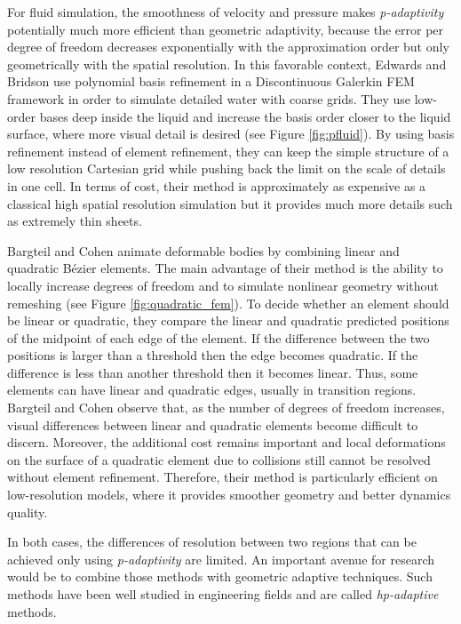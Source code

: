 For fluid simulation, the smoothness of velocity and pressure makes \emph{p-adaptivity} potentially much more efficient than geometric adaptivity, because the error per degree of freedom decreases exponentially with the approximation order but only geometrically with the spatial resolution. In this favorable context, Edwards and Bridson \cite{Edwards2012,Edwards2014} use polynomial basis refinement in a Discontinuous Galerkin FEM framework in order to simulate detailed water with coarse grids. They use low-order bases deep inside the liquid and increase the basis order closer to the liquid surface, where more visual detail is desired (see Figure \ref{fig:pfluid}). By using basis refinement instead of element refinement, they can keep the simple structure of a low resolution Cartesian grid while pushing back the limit on the scale of details in one cell.
In terms of cost, their method is approximately as expensive as a classical high spatial resolution simulation but it provides much more details such as extremely thin sheets.

Bargteil and Cohen \cite{bargteil2014animation} animate deformable bodies by combining linear and quadratic B{\'e}zier elements.
The main advantage of their method is the ability to locally increase degrees of freedom and to simulate nonlinear geometry without remeshing (see Figure \ref{fig:quadratic_fem}).
To decide whether an element should be linear or quadratic, they compare the linear and quadratic predicted positions of the midpoint of each edge of the element. If the difference between the two positions is larger than a threshold then the edge becomes quadratic. If the difference is less than another threshold then it becomes linear. Thus, some elements can have linear and quadratic edges, usually in transition regions. Bargteil and Cohen observe that, as the number of degrees of freedom increases, visual differences between linear and quadratic elements become difficult to discern. Moreover, the additional cost remains important and local deformations on the surface of a quadratic element due to collisions still cannot be resolved without element refinement. Therefore, their method is particularly efficient on low-resolution models, where it provides smoother geometry and better dynamics quality.

In both cases, the differences of resolution between two regions that can be achieved only using \emph{p-adaptivity} are limited. An important avenue for research would be to combine those methods with geometric adaptive techniques. Such methods have been well studied in engineering fields and are called \emph{hp-adaptive} methods.

